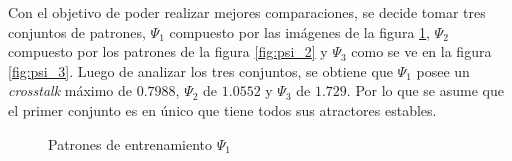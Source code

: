 \documentclass{sig-alternate}
\begin{document}
Con el objetivo de poder realizar mejores comparaciones, se decide tomar tres conjuntos de patrones, $\Psi_1$ compuesto por las imágenes de la figura \ref{fig:psi_1}, $\Psi_2$ compuesto por los patrones de la figura \ref{fig:psi_2} y  $\Psi_3$ como se ve en la figura \ref{fig:psi_3}. Luego de analizar los tres conjuntos, se obtiene que $\Psi_1$ posee un \textit{crosstalk} máximo de $0.7988$,  $\Psi_2$ de $1.0552$ y  $\Psi_3$ de $1.729$. Por lo que se asume que el primer conjunto es en único que tiene todos sus atractores estables. \\
\begin{figure}[ht]
	\begin{center}
		\hspace{10pt}
		\hspace{10pt}
		\hspace{10pt}
		\hspace{10pt}
	\end{center}
\caption{Patrones de entrenamiento $\Psi_1$}
\label{fig:psi_1}
\end{figure}
	
\end{document}
